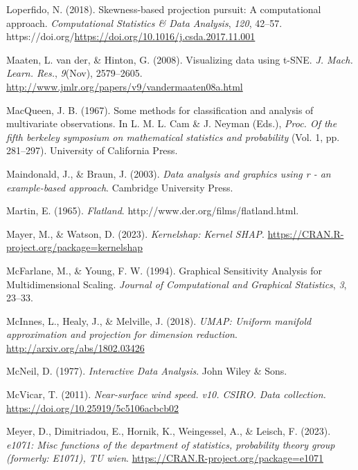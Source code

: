 \documentclass[
  letterpaper,
]{krantz}
\newlength{\cslhangindent}
\newenvironment{CSLReferences}[2] %
 {\begin{list}{}{%
  \setlength{\itemindent}{0pt}
  \setlength{\leftmargin}{0pt}
  \setlength{\parsep}{0pt}
  \ifodd #1
   \setlength{\leftmargin}{\cslhangindent}
   \setlength{\itemindent}{-1\cslhangindent}
  \fi
  \setlength{\itemsep}{#2\baselineskip}}}
 {\end{list}}
\begin{document}
\begin{CSLReferences}{1}{0}
Loperfido, N. (2018). Skewness-based projection pursuit: A computational
approach. \emph{Computational Statistics \& Data Analysis}, \emph{120},
42--57. https://doi.org/\url{https://doi.org/10.1016/j.csda.2017.11.001}

Maaten, L. van der, \& Hinton, G. (2008). Visualizing data using
{t-SNE}. \emph{J. Mach. Learn. Res.}, \emph{9}(Nov), 2579--2605.
\url{http://www.jmlr.org/papers/v9/vandermaaten08a.html}

MacQueen, J. B. (1967). Some methods for classification and analysis of
multivariate observations. In L. M. L. Cam \& J. Neyman (Eds.),
\emph{Proc. Of the fifth berkeley symposium on mathematical statistics
and probability} (Vol. 1, pp. 281--297). University of California Press.

Maindonald, J., \& Braun, J. (2003). \emph{Data analysis and graphics
using r - an example-based approach}. Cambridge University Press.

Martin, E. (1965). \emph{Flatland}.
http://www.der.org/films/flatland.html.

Mayer, M., \& Watson, D. (2023). \emph{Kernelshap: Kernel SHAP}.
\url{https://CRAN.R-project.org/package=kernelshap}

McFarlane, M., \& Young, F. W. (1994). Graphical {S}ensitivity
{A}nalysis for {M}ultidimensional {S}caling. \emph{Journal of
Computational and Graphical Statistics}, \emph{3}, 23--33.

McInnes, L., Healy, J., \& Melville, J. (2018). \emph{{UMAP}: Uniform
manifold approximation and projection for dimension reduction}.
\url{http://arxiv.org/abs/1802.03426}

McNeil, D. (1977). \emph{Interactive {D}ata {A}nalysis}. John Wiley \&
Sons.

McVicar, T. (2011). \emph{Near-surface wind speed. v10. CSIRO. Data
collection.} \url{https://doi.org/10.25919/5c5106acbcb02}

Meyer, D., Dimitriadou, E., Hornik, K., Weingessel, A., \& Leisch, F.
(2023). \emph{e1071: Misc functions of the department of statistics,
probability theory group (formerly: E1071), TU wien}.
\url{https://CRAN.R-project.org/package=e1071}


\end{CSLReferences}
\end{document}

